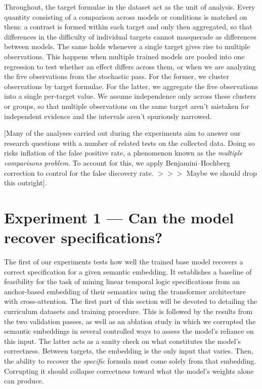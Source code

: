 \documentclass[titlepage,a4paper,11pt]{report}
\begin{document}
    Throughout, the target formulae in the dataset act as the unit of analysis. Every quantity consisting of a comparison across models or conditions is matched on them: a contrast is formed within each target and only then aggregated, so that differences in the difficulty of individual targets cannot masquerade as differences between models. The same holds whenever a single target gives rise to multiple observations. This happens when multiple trained models are pooled into one regression to test whether an effect differs across them, or when we are analyzing the five observations from the stochastic pass. For the former, we cluster observations by target formulae. For the latter, we aggregate the five observations into a single per-target value. We assume independence only across these clusters or groups, so that multiple observations on the same target aren't mistaken for independent evidence and the intervals aren't spuriously narrowed.

    [Many of the analyses carried out during the experiments aim to answer our research questions with a number of related tests on the collected data. Doing so risks inflation of the false positive rate, a phenomenon known as the \emph{multiple comparisons problem}. To account for this, we apply Benjamini--Hochberg correction to control for the false discovery rate. $>>>$ Maybe we should drop this outright].
    
    
    \section{Experiment 1 --- Can the model recover specifications?} \label{sec:exp1_feasibility}
    The first of our experiments tests how well the trained base model recovers a correct specification for a given semantic embedding. It establishes a baseline of feasibility for the task of mining linear temporal logic specifications from an anchor-based embedding of their semantics using the transformer architecture with cross-attention. The first part of this section will be devoted to detailing the curriculum datasets and training procedure. This is followed by the results from the two validation passes, as well as an ablation study in which we corrupted the semantic embeddings in several controlled ways to assess the model's reliance on this input. The latter acts as a sanity check on what constitutes the model's correctness. Between targets, the embedding is the only input that varies. Then, the ability to recover the \emph{specific} formula must come solely from that embedding. Corrupting it should collapse correctness toward what the model's weights alone can produce.
\end{document}

